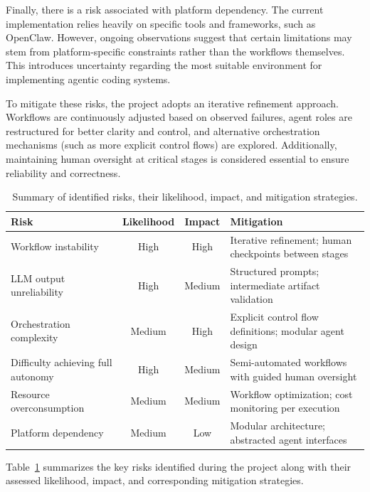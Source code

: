 \documentclass[a4paper,12pt]{report}
\begin{document}
Finally, there is a risk associated with platform dependency. The current implementation relies heavily on specific tools and frameworks, such as OpenClaw. However, ongoing observations suggest that certain limitations may stem from platform-specific constraints rather than the workflows themselves. This introduces uncertainty regarding the most suitable environment for implementing agentic coding systems.

To mitigate these risks, the project adopts an iterative refinement approach. Workflows are continuously adjusted based on observed failures, agent roles are restructured for better clarity and control, and alternative orchestration mechanisms (such as more explicit control flows) are explored. Additionally, maintaining human oversight at critical stages is considered essential to ensure reliability and correctness.

\begin{table}[h!]
\caption[Risk analysis]{Summary of identified risks, their likelihood, impact, and mitigation strategies.}
\begin{center}
\small
\begin{tabular}{|l|c|c|p{5cm}|} \hline
\textbf{Risk} & \textbf{Likelihood} & \textbf{Impact} & \textbf{Mitigation} \\\hline
Workflow instability & High & High & Iterative refinement; human checkpoints between stages \\\hline
LLM output unreliability & High & Medium & Structured prompts; intermediate artifact validation \\\hline
Orchestration complexity & Medium & High & Explicit control flow definitions; modular agent design \\\hline
Difficulty achieving full autonomy & High & Medium & Semi-automated workflows with guided human oversight \\\hline
Resource overconsumption & Medium & Medium & Workflow optimization; cost monitoring per execution \\\hline
Platform dependency & Medium & Low & Modular architecture; abstracted agent interfaces \\\hline
\end{tabular}
\label{table:riskAnalysis}
\end{center}
\end{table}

Table~\ref{table:riskAnalysis} summarizes the key risks identified during the project along with their assessed likelihood, impact, and corresponding mitigation strategies.
\end{document}
